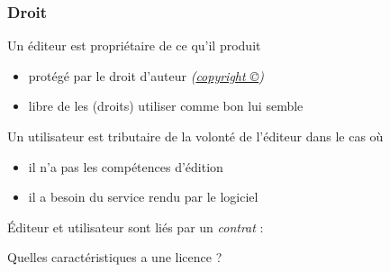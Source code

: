 \documentclass[10pt]{beamer}
\begin{document}
\begin{frame}
  \frametitle{Droit}

  Un éditeur est propriétaire de ce qu'il produit

  \begin{itemize}
  \item protégé par le droit d'auteur \emph{(\href{https://fr.wikipedia.org/wiki/Droit_d\%27auteur}{copyright \copyright})}
  \item libre de les (droits) utiliser comme bon lui semble
  \end{itemize}

  \vfill
  
  Un utilisateur est tributaire de la volonté de l'éditeur dans le cas où 

  \begin{itemize}
  \item il n'a pas les compétences d'édition
  \item il a besoin du service rendu par le logiciel
  \end{itemize}

  \vfill
  
  \begin{center}
    \begin{alertenv}
      Éditeur et utilisateur sont liés par un \emph{contrat} :

      \bigskip

      \textbf{}
    \end{alertenv}
  \end{center}

  \vfill

  Quelles caractéristiques a une licence ?
\end{frame}

\end{document}
